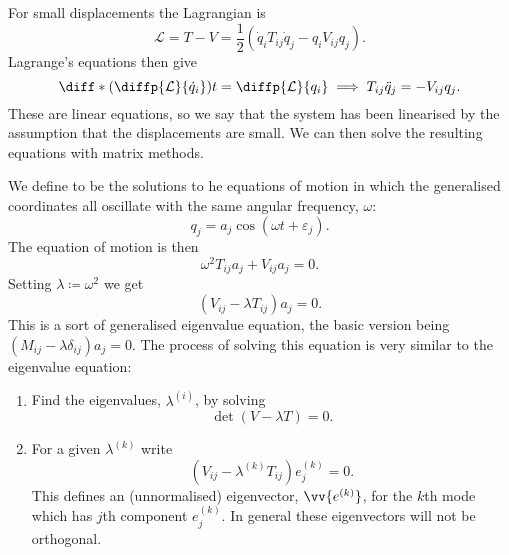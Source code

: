 \documentclass[fleqn]{NotesClass}
\newcommand*{\lagrangian}{\mathcal{L}}
\begin{document}
    For small displacements the Lagrangian is
    \begin{equation}
        \lagrangian = T - V = \frac{1}{2}(\dot{q}_iT_{ij}\dot{q}_j - q_iV_{ij}q_j).
    \end{equation}
    Lagrange's equations then give
    \begin{equation}
        \diff*{\left( \diffp{\lagrangian}{\dot{q}_i} \right)}{t} = \diffp{\lagrangian}{q_i} \implies T_{ij}\ddot{q}_j = -V_{ij}q_j.
    \end{equation}
    These are linear equations, so we say that the system has been linearised by the assumption that the displacements are small.
    We can then solve the resulting equations with matrix methods.
    
    We define  to be the solutions to he equations of motion in which the generalised coordinates all oscillate with the same angular frequency, \(\omega\):
    \begin{equation}
        q_j = a_j\cos(\omega t + \varepsilon_j).
    \end{equation}
    The equation of motion is then
    \begin{equation}
        \omega^2T_{ij}a_j + V_{ij}a_j = 0.
    \end{equation}
    Setting \(\lambda \coloneqq \omega^2\) we get
    \begin{equation}
        (V_{ij} - \lambda T_{ij})a_j = 0.
    \end{equation}
    This is a sort of generalised eigenvalue equation, the basic version being \((M_{ij} - \lambda\delta_{ij})a_j = 0\).
    The process of solving this equation is very similar to the eigenvalue equation:
    \begin{enumerate}
        \item Find the eigenvalues, \(\lambda^{(i)}\), by solving
        \begin{equation}
            \det(V - \lambda T) = 0.
        \end{equation}
        \item For a given \(\lambda^{(k)}\) write
        \begin{equation}
            (V_{ij} - \lambda^{(k)}T_{ij})e_j^{(k)} = 0.
        \end{equation}
        This defines an (unnormalised) eigenvector, \(\vv{e^{(k)}}\), for the \(k\)th mode which has \(j\)th component \(e_j^{(k)}\).
        In general these eigenvectors will not be orthogonal.
    \end{enumerate}
    
\end{document}
